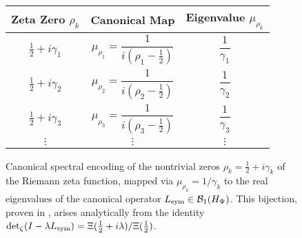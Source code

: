 \begin{figure}[ht]
\centering
\renewcommand{\arraystretch}{1.25}
\begin{tabular}{c|c|c}
\toprule
\textbf{Zeta Zero \( \rho_k \)} & \textbf{Canonical Map} & \textbf{Eigenvalue \( \mu_{\rho_k} \)} \\
\midrule
\( \tfrac{1}{2} + i\gamma_1 \) & \( \mu_{\rho_1} = \dfrac{1}{i(\rho_1 - \tfrac{1}{2})} \) & \( \dfrac{1}{\gamma_1} \) \\
\( \tfrac{1}{2} + i\gamma_2 \) & \( \mu_{\rho_2} = \dfrac{1}{i(\rho_2 - \tfrac{1}{2})} \) & \( \dfrac{1}{\gamma_2} \) \\
\( \tfrac{1}{2} + i\gamma_3 \) & \( \mu_{\rho_3} = \dfrac{1}{i(\rho_3 - \tfrac{1}{2})} \) & \( \dfrac{1}{\gamma_3} \) \\
\( \vdots \) & \( \vdots \) & \( \vdots \) \\
\bottomrule
\end{tabular}
\caption{
Canonical spectral encoding of the nontrivial zeros \( \rho_k = \tfrac{1}{2} + i\gamma_k \) of the Riemann zeta function, mapped via \( \mu_{\rho_k} = 1/\gamma_k \) to the real eigenvalues of the canonical operator \( L_{\mathrm{sym}} \in \mathcal{B}_1(H_{\Psi}) \). This bijection, proven in , arises analytically from the identity \( \det\nolimits_\zeta(I - \lambda L_{\mathrm{sym}}) = \Xi(\tfrac{1}{2} + i\lambda)/\Xi(\tfrac{1}{2}) \).
}
\label{fig:schematic_bijection_table}
\end{figure}
